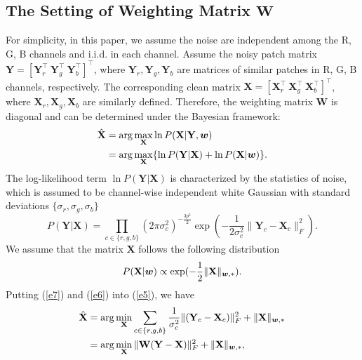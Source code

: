 \documentclass[10pt,twocolumn,letterpaper,sort&compress]{article}
\begin{document}
\subsection{The Setting of Weighting Matrix $\mathbf{W}$}
For simplicity, in this paper, we assume the noise are independent among the R, G, B channels and i.i.d. in each channel. Assume the noisy patch matrix $\mathbf{Y}=[\mathbf{Y}_{r}^{\top}\ \mathbf{Y}_{g}^{\top}\ \mathbf{Y}_{b}^{\top}]^{\top}$, where $\mathbf{Y}_{r}, \mathbf{Y}_{g}, \mathbf{Y}_{b}$ are matrices of similar patches in R, G, B channels, respectively. The corresponding clean matrix $\mathbf{X}=[\mathbf{X}_{r}^{\top}\ \mathbf{X}_{g}^{\top}\ \mathbf{X}_{b}^{\top}]^{\top}$, where $\mathbf{X}_{r}, \mathbf{X}_{g}, \mathbf{X}_{b}$ are similarly defined. Therefore, the weighting matrix $\mathbf{W}$ is diagonal and can be determined under the Bayesian framework:
\vspace{-1mm}
\begin{equation}
\label{e5}
\vspace{-1mm}
\begin{split}
\hat{\mathbf{X}} 
&=
\arg\max_{\mathbf{X}}\ln P(\mathbf{X}|\mathbf{Y},\bm{w})
\\
&
=
\arg\max_{\mathbf{X}}\{\ln P(\mathbf{Y}|\mathbf{X})+\ln P(\mathbf{X}|\bm{w})\}.
\end{split}
\end{equation}
The log-likelihood term $\ln P(\mathbf{Y}|\mathbf{X})$ is characterized by the
statistics of noise, which is assumed to be channel-wise independent white Gaussian with standard deviations $\{\sigma_{r}, \sigma_{g}, \sigma_{b}\}$
\vspace{-1mm}
\begin{equation}
\label{e6}
P(\mathbf{Y}|\mathbf{X}) 
= 
\prod_{c\in\{r, g, b\}}
(2\pi\sigma_{c}^{2})^{-\frac{3p^{2}}{2}}
\exp(-\frac{1}{2\sigma_{c}^{2}}\|\mathbf{Y}_{c}-\mathbf{X}_{c}\|_{F}^{2}).
\end{equation}
We assume that the matrix $\mathbf{X}$ follows the following distribution
\vspace{-1mm}
\begin{equation}
\label{e7}
\vspace{-1mm}
P(\mathbf{X}|\bm{w})
\propto
\exp(-\frac{1}{2}\|\mathbf{X}\|_{\bm{w},*}).
\end{equation}
Putting (\ref{e7}) and (\ref{e6}) into (\ref{e5}), we have
\vspace{-1mm}
\begin{equation}
\label{e8}
\begin{split}
\vspace{-1mm}
\hat{\mathbf{X}}
&
=
\arg\min_{\mathbf{X}}
\sum_{c\in\{r, g, b\}}
\frac{1}{\sigma_{c}^{2}}\|(\mathbf{Y}_{c}-\mathbf{X}_{c})\|_{F}^{2}+\|\mathbf{X}\|_{\bm{w},*}
\\
&
=
\arg\min_{\mathbf{X}}\|\mathbf{W}(\mathbf{Y}-\mathbf{X})\|_{F}^{2}+\|\mathbf{X}\|_{\bm{w},*},
\end{split}
\end{equation}
\end{document}
